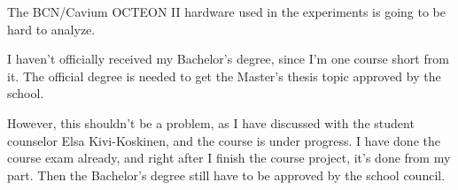 The BCN/Cavium OCTEON II hardware used in the experiments is going to be hard to analyze.

I haven't officially received my Bachelor's degree, since I'm one course short from it. The official degree is needed to get the Master's thesis topic approved by the school.

However, this shouldn't be a problem, as I have discussed with the student counselor Elsa Kivi-Koskinen, and the course is under progress. I have done the course exam already, and right after I finish the course project, it's done from my part. Then the Bachelor's degree still have to be approved by the school council.

